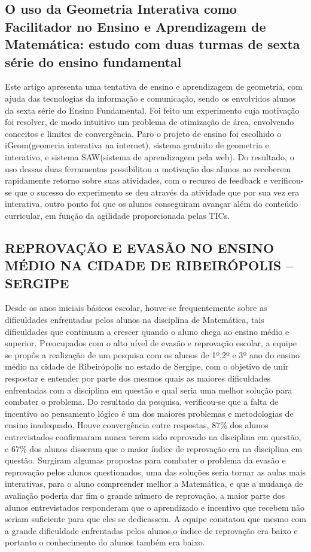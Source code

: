 \documentclass[12pt,a4paper]{article}
\begin{document}
\subsection{O uso da Geometria Interativa como Facilitador no Ensino e Aprendizagem de Matemática: 
estudo com duas turmas de sexta série do ensino fundamental}

Este artigo apresenta uma tentativa de ensino e aprendizagem de geometria, com ajuda das tecnologias da informação e comunicação, sendo os envolvidos alunos da sexta série do Ensino Fundamental. 
Foi feito um experimento cuja motivação foi resolver, de modo intuitivo um problema de otimização de área, envolvendo conceitos e limites de convergência. Paro o projeto de ensino foi escolhido o iGeom(geomeria interativa na internet), sistema gratuito de geometria e interativo, e sistema SAW(sistema de aprendizagem pela web).
Do resultado, o uso dessas duas ferramentas possibilitou a motivação dos alunos ao receberem rapidamente retorno sobre suas atividades, com o recurso de feedback e verificou-se que o sucesso do experimento se deu através da atividade que por sua vez era interativa, outro ponto foi que os alunos conseguiram avançar além do conteúdo curricular, em função da agilidade proporcionada pelas TICs.\citep{tanbellini2010uso}

\subsection{REPROVAÇÃO E EVASÃO NO ENSINO MÉDIO NA CIDADE DE  RIBEIRÓPOLIS – SERGIPE}
Desde os anos iniciais básicos escolar, houve-se frequentemente sobre as dificuldades enfrentadas pelos alunos na disciplina de Matemática, tais dificuldades que continuam a crescer quando o aluno chega ao ensino médio e superior. Preocupados com o alto nível de evasão e reprovação escolar, a equipe se propôs a realização de um pesquisa com os alunos de 1º,2º e 3º ano do ensino médio na cidade de Ribeirópolis no estado de Sergipe, com o objetivo de unir respostar e entender por parte dos mesmos quais as maiores dificuldades enfrentadas com a disciplina em questão e qual seria uma melhor solução para combater o problema.
Do resultado da pesquisa, verificou-se que a falta de incentivo ao pensamento lógico é um dos maiores problemas e metodologias de ensino inadequado. Houve convergência entre respostas, 87\% dos alunos entrevistados confirmaram nunca terem sido reprovado na disciplina em questão, e 67\% dos alunos disseram que o maior índice de reprovação era na disciplina em questão. 
Surgiram algumas propostas para combater o problema da evasão e reprovação pelos alunos questionados, uma das soluções seria tornar as aulas mais interativas, para o aluno compreender melhor a Matemática, e que a mudança de avaliação poderia dar fim o grande número de reprovação, a maior parte dos alunos entrevistados responderam que o aprendizado e incentivo que recebem não seriam suficiente para que eles se dedicassem. 
A equipe constatou que mesmo com a grande dificuldade enfrentadas pelos alunos,o índice de reprovação era baixo e portanto o conhecimento do alunos também era baixo.\citep{santosreprovaccao}
\end{document}
